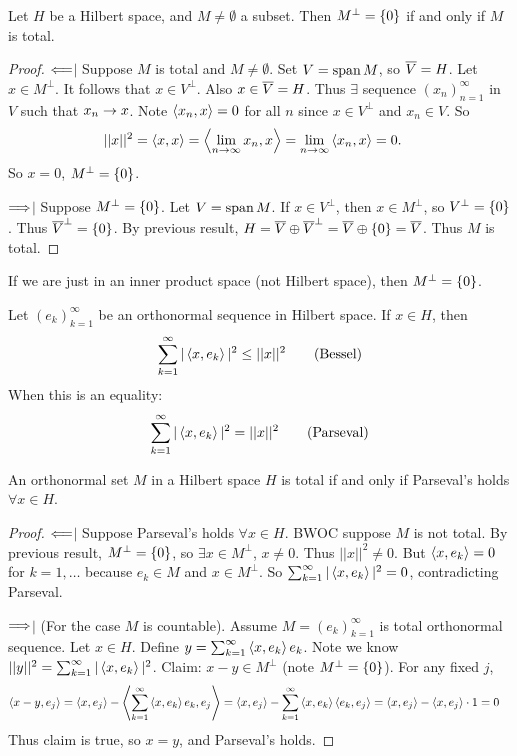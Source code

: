 \documentclass[]{article}
\begin{document}
\begin{lemma}
	Let $H$ be a Hilbert space, and $M\neq\emptyset$ a subset.
	Then $M^\perp = \left\{ 0 \right\}$ if and only if $M$ is total. %
\end{lemma}
\begin{proof}
	\ul{$\Longleftarrow$}$\mid$ Suppose $M$ is total and $M\neq\emptyset$.
	Set $V = \text{span}\,M$, so $\overline{V}=H$.
	Let $x\in M^\perp$. It follows that $x\in V^\perp$.
	Also $x\in\overline{V}=H$. Thus $\exists$ sequence $(x_n)_{n=1}^\infty$ in $V$ such that $x_n\rightarrow x$.
	Note $\left\langle x_n,x \right\rangle=0$ for all $n$ since $x\in V^\perp$ and $x_n\in V$. So 
	\begin{align*}
		||x||^2 &= \left\langle x,x \right\rangle = \left\langle \lim_{n\rightarrow\infty}x_n,x \right\rangle = \lim_{n\rightarrow\infty}\left\langle x_n,x \right\rangle = 0.
	\end{align*}
	So $x=0$, $M^\perp=\left\{ 0 \right\}$.

	\ul{$\Longrightarrow$}$\mid$ Suppose $M^\perp=\left\{ 0 \right\}$. Let $V=\text{span}\,M$.
	If $x\in V^\perp$, then $x\in M^\perp$, so $V^\perp=\left\{ 0 \right\}$.
	Thus $\overline{V}^\perp = \left\{ 0 \right\}$.
	By previous result, $H = \overline{V}\oplus\overline{V}^\perp = \overline{V}\oplus\left\{ 0 \right\}=\overline{V}$.
	Thus $M$ is total.
\end{proof}
\begin{remark}
	If we are just in an inner product space (not Hilbert space), then $M^\perp=\left\{ 0 \right\}$.
\end{remark}

\begin{recall}
	Let $(e_k)_{k=1}^\infty$ be an orthonormal sequence in Hilbert space.
	If $x\in H$, then $$ \sum_{k=1}^\infty |\left\langle x,e_k \right\rangle|^2 \leq ||x||^2 \qquad \text{(Bessel)}$$
	When this is an equality: $$ \sum_{k=1}^\infty |\left\langle x,e_k \right\rangle|^2 = ||x||^2 \qquad \text{(Parseval)} $$
\end{recall}
\begin{theorem}
	An orthonormal set $M$ in a Hilbert space $H$ is total if and only if Parseval's holds $\forall x\in H$.
\end{theorem}
\begin{proof}
	\ul{$\Longleftarrow$}$\mid$ Suppose Parseval's holds $\forall x\in H$.
	BWOC suppose $M$ is not total.
	By previous result, $M^\perp=\left\{ 0 \right\}$, so $\exists x\in M^\perp$, $x\neq0$.
	Thus $||x||^2\neq0$. But $\left\langle x,e_k \right\rangle=0$ for $k=1,\dots$ because $e_k\in M$ and $x\in M^\perp$.
	So $\sum_{k=1}^\infty |\left\langle x,e_k \right\rangle|^2=0$, contradicting Parseval.

	\ul{$\Longrightarrow$}$\mid$ (For the case $M$ is countable).
	Assume $M=(e_k)_{k=1}^\infty$ is total orthonormal sequence.
	Let $x\in H$. Define $y=\sum_{k=1}^\infty \left\langle x,e_k \right\rangle e_k$.
	Note we know $||y||^2 = \sum_{k=1}^\infty |\left\langle x,e_k \right\rangle|^2$.
	Claim: $x-y\in M^\perp$ (note $M^\perp=\left\{ 0 \right\}$).
	For any fixed $j$, 
	\begin{align*}
		\left\langle x-y,e_j \right\rangle &= \left\langle x,e_j \right\rangle-\left\langle \sum_{k=1}^\infty\left\langle x,e_k \right\rangle e_k,e_j \right\rangle
					  = \left\langle x,e_j \right\rangle-\sum_{k=1}^\infty \left\langle x,e_k \right\rangle\left\langle e_k,e_j \right\rangle
					  = \left\langle x,e_j \right\rangle-\left\langle x,e_j \right\rangle\cdot 1 = 0
	\end{align*}
	Thus claim is true, so $x=y$, and Parseval's holds.
\end{proof}
\end{document}
